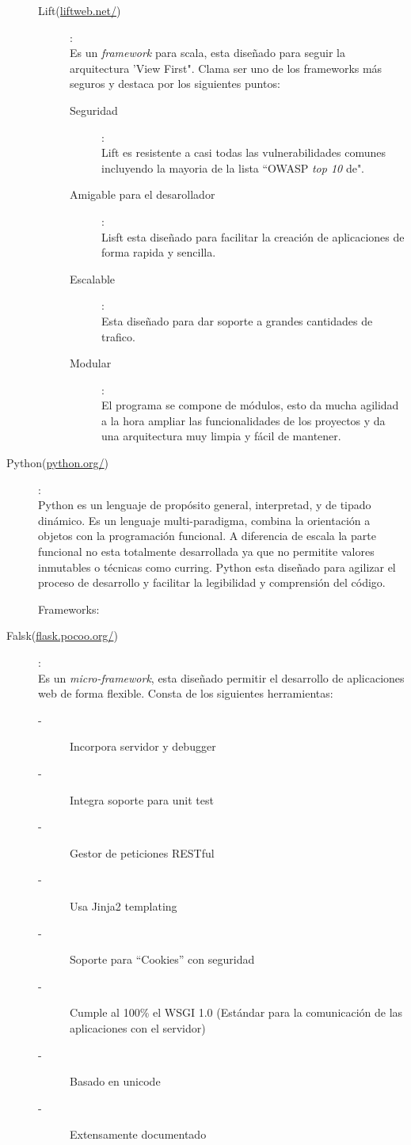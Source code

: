 \documentclass[12pt]{article} %
\begin{document}
\begin{description}
\begin{description}
\item[Lift(\url{liftweb.net/})]:
\\Es un \textit{framework} para scala, esta diseñado para seguir la arquitectura 'View First". Clama ser uno de los frameworks más seguros y destaca por los siguientes puntos:
\begin{description}
\item[Seguridad]: \\Lift es resistente a casi todas las vulnerabilidades comunes incluyendo la mayoria de la lista ``OWASP \textit{top 10} de".
\item[Amigable para el desarollador]: \\Lisft esta diseñado para facilitar la creación de aplicaciones de forma rapida y sencilla.
\item[Escalable]: \\Esta diseñado para dar soporte a grandes cantidades de trafico.
\item[Modular]: \\El programa se compone de módulos, esto da mucha agilidad a la hora ampliar las funcionalidades de los proyectos y da una arquitectura muy limpia y fácil de mantener.
\end{description}
\end{description}

\item[Python(\url{python.org/})]:
\\Python es un lenguaje de propósito general, interpretad, y de tipado dinámico. Es un lenguaje multi-paradigma, combina la orientación a objetos con la programación funcional. A diferencia de escala la parte funcional no esta totalmente desarrollada ya que no permitite valores inmutables o técnicas como curring. Python esta diseñado para agilizar el proceso de desarrollo y facilitar la legibilidad y comprensión del código.

Frameworks:
\item[Falsk(\url{flask.pocoo.org/})]:
\\Es un \textit{micro-framework}, esta diseñado permitir el desarrollo de aplicaciones web de forma flexible. Consta de los siguientes herramientas:
\begin{description}
\item[-]Incorpora servidor y debugger
\item[-]Integra soporte para unit test
\item[-]Gestor de peticiones RESTful
\item[-]Usa Jinja2 templating
\item[-]Soporte para ``Cookies'' con seguridad
\item[-]Cumple al 100\% el WSGI 1.0 (Estándar para la comunicación de las aplicaciones con el servidor) 
\item[-]Basado en unicode
\item[-]Extensamente documentado
\end{description}


\end{description}
\end{document}
